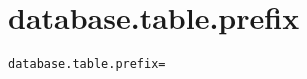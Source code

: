 \section{database.table.prefix}
\label{configuration:DatabaseTablePrefix}
\AvailableInJavaOnly{\TODO}
\begin{lstlisting}[style=Props,caption={Usage example for \textit{database.table.prefix}}]
database.table.prefix=
\end{lstlisting}